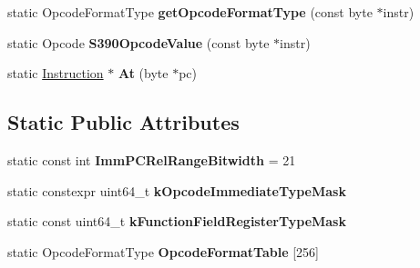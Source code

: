 \begin{DoxyCompactItemize}
\item 
static Opcode\+Format\+Type {\bfseries get\+Opcode\+Format\+Type} (const byte $\ast$instr)\hypertarget{classv8_1_1internal_1_1_instruction_a4adaa2f1f1687001718a1ce29f51bb7a}{}\label{classv8_1_1internal_1_1_instruction_a4adaa2f1f1687001718a1ce29f51bb7a}

\item 
static Opcode {\bfseries S390\+Opcode\+Value} (const byte $\ast$instr)\hypertarget{classv8_1_1internal_1_1_instruction_a9ec1310621a44573f53df905664f7e14}{}\label{classv8_1_1internal_1_1_instruction_a9ec1310621a44573f53df905664f7e14}

\item 
static \hyperlink{classv8_1_1internal_1_1_instruction}{Instruction} $\ast$ {\bfseries At} (byte $\ast$pc)\hypertarget{classv8_1_1internal_1_1_instruction_ababb29269d211ebdc2c9c772e06dc85e}{}\label{classv8_1_1internal_1_1_instruction_ababb29269d211ebdc2c9c772e06dc85e}

\end{DoxyCompactItemize}
\subsection*{Static Public Attributes}
\begin{DoxyCompactItemize}
\item 
static const int {\bfseries Imm\+P\+C\+Rel\+Range\+Bitwidth} = 21\hypertarget{classv8_1_1internal_1_1_instruction_aa9f82f3a387d3ae9e7a615077602cccb}{}\label{classv8_1_1internal_1_1_instruction_aa9f82f3a387d3ae9e7a615077602cccb}

\item 
static constexpr uint64\+\_\+t {\bfseries k\+Opcode\+Immediate\+Type\+Mask}
\item 
static const uint64\+\_\+t {\bfseries k\+Function\+Field\+Register\+Type\+Mask}
\item 
static Opcode\+Format\+Type {\bfseries Opcode\+Format\+Table} \mbox{[}256\mbox{]}\hypertarget{classv8_1_1internal_1_1_instruction_ac0a399cb509d4df1428caf368a1bcb71}{}\label{classv8_1_1internal_1_1_instruction_ac0a399cb509d4df1428caf368a1bcb71}

\end{DoxyCompactItemize}
